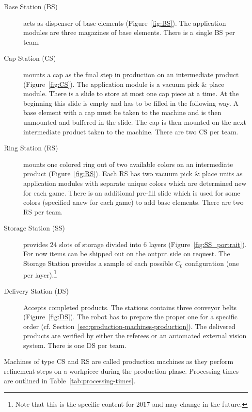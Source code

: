 \documentclass[12pt,twoside]{article}
\newcommand{\refsec}[1]{Section~\ref{#1}}
\newcommand{\reffig}[1]{Figure~\ref{#1}}
\newcommand{\reftab}[1]{Table~\ref{#1}}
\begin{document}
\begin{description}
\item[Base Station (BS)] acts as dispenser of base elements
  (\reffig{fig:BS}). The application modules are three magazines of
  base elements. There is a single BS per team.

\item[Cap Station (CS)] mounts a cap as the final step in production
  on an intermediate product (\reffig{fig:CS}). The application module
  is a vacuum pick \& place module. There is a slide to store at most
  one cap piece at a time. At the beginning this slide is empty and
  has to be filled in the following way.  A base element with a cap
  must be taken to the machine and is then unmounted and buffered in
  the slide. The cap is then mounted on the next intermediate product
  taken to the machine. There are two CS per team.

\item[Ring Station (RS)] mounts one colored ring out of two available
  colors on an intermediate product (\reffig{fig:RS}). Each RS has two
  vacuum pick \& place units as application modules with separate
  unique colors which are determined new for each game. There is an
  additional pre-fill slide which is used for some colors (specified
  anew for each game) to add base elements. There are two RS per team.

\item[Storage Station (SS)] provides 24 slots of storage divided into
  6 layers (\reffig{fig:SS_portrait}). For now items can be  shipped out on the output side on
  request. The Storage Station provides a sample of each possible
  $C_0$ configuration (one per layer).\footnote{Note that this is the
    specific content for 2017 and may change in the future.}

\item[Delivery Station (DS)] Accepts completed products. The stations
  contains three conveyor belts (\reffig{fig:DS}). The robot has to
  prepare the proper one for a specific order
  (cf. \refsec{sec:production-machines-production}). The delivered
  products are verified by either the referees or an automated
  external vision system. There is one DS per team.
\end{description}

\noindent
Machines of type CS and RS are called production machines as they
perform refinement steps on a workpiece during the production
phase. Processing times are outlined in \reftab{tab:processing-times}.
\end{document}
